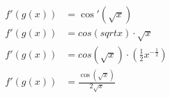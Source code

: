 \documentclass[preview]{standalone}
\begin{document}
\begin{align*}
f'(g(x))&= \cos'(\sqrt{x}) \\ f'(g(x))&=cos(sqrt{x}) \cdot \sqrt{x} \\ f'(g(x))&=cos(\sqrt{x}) \cdot (\frac{1}{2}x^{-\frac{1}{2}}) \\ f'(g(x))&=\frac{\cos(\sqrt{x})}{2\sqrt{x}}
\end{align*}
\end{document}
